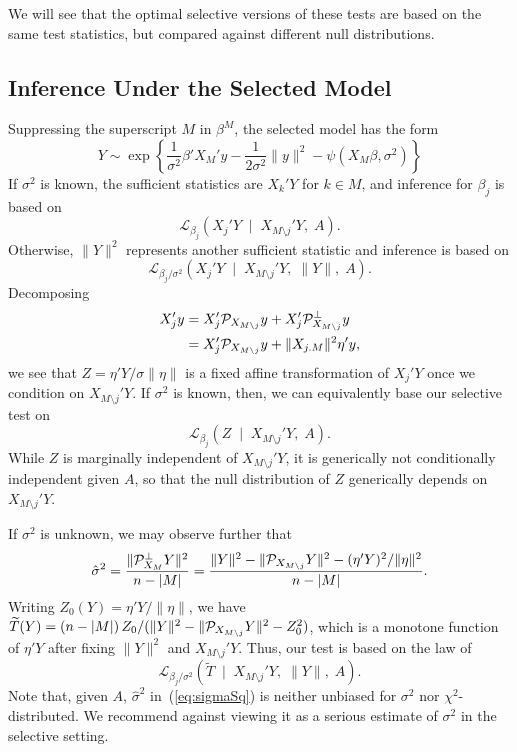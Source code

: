 \documentclass{article}
\theoremstyle{definition}
\newcommand{\bX}{X}
\newcommand{\Gv}{\;\;\big|\;\;}
\newcommand{\proj}{\cP}
\newcommand{\cL}{\mathcal{L}}
\begin{document}
We will see that the optimal selective versions of these tests are based on the same test statistics, but compared against different null distributions.



\subsection{Inference Under the Selected Model}\label{sec:reducedModel}

Suppressing the superscript $M$ in $\beta^{M}$, the selected model has the form
\begin{equation}
  Y \sim \exp\left\{\frac{1}{\sigma^2}\beta'{\bX_M}'y - \frac{1}{2\sigma^2}\|y\|^2 - \psi(\bX_M\beta,\sigma^2)\right\}
\end{equation}
If $\sigma^2$ is known, the sufficient statistics are $X_k'Y$ for $k\in M$, and inference for $\beta_j$ is based on
\begin{equation}
  \cL_{\beta_j}\left(X_j'Y \Gv {\bX_{M\setminus j}}'Y, \; A\right).
\end{equation}
Otherwise, $\|Y\|^2$ represents another sufficient statistic and inference is based on
\begin{equation}
  \cL_{\beta_j/\sigma^2}\left(X_j'Y \Gv {\bX_{M\setminus j}}'Y, \; \|Y\|, \; A\right).
\end{equation}
Decomposing
\begin{align}
  X_j'y
  &= X_j'\proj_{\bX_{M\setminus j}} y
  + X_j'\proj_{\bX_{M\setminus j}}^\perp y \\
  &= X_j'\proj_{\bX_{M\setminus j}} y + \|X_{j.M}\|^2 \eta'y,
\end{align}
we see that $Z=\eta'Y / \sigma \|\eta\|$ is a fixed affine transformation of $X_j'Y$ once we condition on $X_{M\setminus j}'Y$. If $\sigma^2$ is known, then, we can equivalently base our selective test on
\begin{equation}
  \cL_{\beta_j}\left(Z \Gv {\bX_{M\setminus j}}'Y, \; A\right).
\end{equation}
While $Z$ is marginally independent of $X_{M\setminus j}'Y$, it is generically not conditionally independent given $A$, so that the null distribution of $Z$ generically depends on $X_{M\setminus j}'Y$.

If $\sigma^2$ is unknown, we may observe further that
\begin{equation}\label{eq:sigmaSq}
\hat \sigma^2 = \frac{\|\proj_{\bX_M}^\perp Y\|^2}{n-|M|}
= \frac{\|Y\|^2 - \|\proj_{\bX_{M\setminus j}} Y\|^2 - (\eta'Y)^2/\|\eta\|^2}{n-|M|}.
\end{equation}
Writing $Z_0(Y) = \eta'Y / \|\eta\|$, we have
$\widetilde T(Y) = (n-|M|) \,Z_0/(\|Y\|^2 - \|\proj_{X_{M\setminus j}} Y\|^2 - Z_0^2)$, which is a monotone function of $\eta'Y$ after fixing $\|Y\|^2$ and $X_{M\setminus j}'Y$. Thus, our test is based on the law of
\begin{equation}
  \cL_{\beta_j/\sigma^2}\left(\widetilde T \Gv {\bX_{M\setminus j}}'Y, \; \|Y\|, \; A\right).
\end{equation}
Note that, given $A$, $\hat\sigma^2$ in~(\ref{eq:sigmaSq}) is neither unbiased for $\sigma^2$ nor $\chi^2$-distributed. We recommend against viewing it as a serious estimate of $\sigma^2$ in the selective setting.
\end{document}
